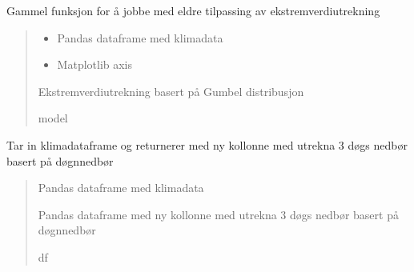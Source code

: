 \documentclass[letterpaper,10pt,norsk]{sphinxmanual}
\begin{document}
\begin{fulllineitems}
\label{\detokenize{index:klimadata.klimadata.plot_ekstremverdier_3dsno}}
\pysigstartsignatures
{}
\pysigstopsignatures
\sphinxAtStartPar
Gammel funksjon for å jobbe med eldre tilpassing av ekstremverdiutrekning
\begin{quote}\begin{description}
\begin{itemize}
\item {} 
\sphinxAtStartPar
{} \textendash{} Pandas dataframe med klimadata

\item {} 
\sphinxAtStartPar
{} \textendash{} Matplotlib axis

\end{itemize}

\sphinxAtStartPar
Ekstremverdiutrekning basert på Gumbel distribusjon

\sphinxAtStartPar
model

\end{description}\end{quote}

\end{fulllineitems}


\begin{fulllineitems}
\label{\detokenize{index:klimadata.klimadata.rullande_3dogn_nedbor}}
\pysigstartsignatures
{}
\pysigstopsignatures
\sphinxAtStartPar
Tar in klimadataframe og returnerer med ny kollonne med utrekna 3 døgs nedbør basert på døgnnedbør
\begin{quote}\begin{description}
\sphinxAtStartPar
{} \textendash{} Pandas dataframe med klimadata

\sphinxAtStartPar
Pandas dataframe med ny kollonne med utrekna 3 døgs nedbør basert på døgnnedbør

\sphinxAtStartPar
df

\end{description}\end{quote}

\end{fulllineitems}
\end{document}
